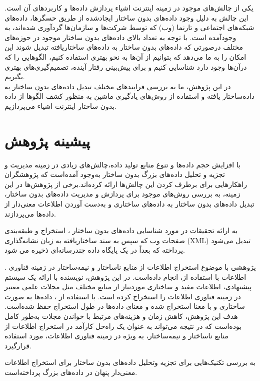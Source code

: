 یکی از چالش‌های موجود در زمینه اینترنت اشیاء پردازش داده‌ها و کاربرد‌های آن است. این چالش به دلیل وجود داده‌های بدون ساختار ایجاد‌شده از طریق حسگرها، داده‌های شبکه‌های اجتماعی و تارنما (وب) که توسط شرکت‌ها و سازمان‌ها گرد‌آوری شده‌اند، به وجود‌آمده است. با توجه به تعداد بالای داده‌های بدون ساختار موجود در حوزه‌های مختلف درصورتی که داده‌های بدون ساختار به داده‌های ساختاریافته تبدیل شوند این امکان را به ما می‌دهد که بتوانیم از آن‌ها به نحو بهتری استفاده کنیم، الگوهایی را که درآن‌ها وجود دارد شناسایی کنیم و برای پیش‌بینی رفتار آینده، تصمیم‌گیری‌های بهتری بگیریم.
\\
در این پژوهش، ما به بررسی فرایندهای مختلف تبدیل داده‌های بدون ساختار به داده‌ساختار یافته و استفاده از روش‌های یادگیری ماشین به منظور کشف الگوها از داده‌ بدون ساختار اینترنت اشیاء می‌پردازیم.
\section{پیشینه پژوهش}
با افزایش حجم داده‌ها و تنوع منابع تولید داده،چالش‌های زیادی در زمینه مدیریت و تجزیه و تحلیل داده‌های بزرگ بدون ساختار به‌وجود آمده‌است که پژوهشگران راهکارهایی برای برطرف کردن این چالش‌ها ارائه‌ کرده‌اند.برخی از پژوهش‌ها در این زمینه، به بررسی روش‌های موجود برای پردازش و مدیریت داده‌های بدون ساختار، تبدیل داده‌های بدون ساختار به داده‌های ساختاری و به‌دست آوردن اطلاعات معنی‌دار از داده‌ها می‌پردازند. 

\cite{abidin2010}
به ارائه تحقیقات در مورد شناسایی داده‌های بدون ساختار ، استخراج و طبقه‌بندی صفحات وب که سپس به سند ساختاریافته به زبان نشانه‌گذاری (XML) تبدیل می‌شود پرداخته که بعداً در یک پایگاه داده چندرسانه‌ای ذخیره می شود.

\citep{gandhi2016}.
پژوهشی با موضوع استخراج اطلاعات از منابع نا‌ساختار و نیمه‌ساختار در زمینه فناوری اطلاعات با استفاده از، انجام داده‌است. در این پژوهش، نویسنده با ارائه یک سیستم پیشنهادی، اطلاعات مفید و ساختاری موردنیاز از منابع مختلف مثل مجلات علمی معتبر در زمینه فناوری اطلاعات را استخراج کرده است. با استفاده از ، داده‌ها به صورت ساختاری و با معنا استخراج شده و معنای داده‌ها در طول استخراج حفظ شده‌است. هدف این پژوهش، کاهش زمان و هزینه‌های مرتبط با خواندن مجلات به‌طور کامل بوده‌است که در نتیجه می‌تواند به عنوان یک راه‌حل کارآمد در استخراج اطلاعات از منابع نا‌ساختار و نیمه‌ساختار، به ویژه در زمینه فناوری اطلاعات، مورد استفاده قرارگیرد.

\cite{mishra2017}
به بررسی تکنیک‌هایی برای تجزیه وتحلیل داده‌های بدون ساختار برای استخراج اطلاعات معنی‌دار پنهان در داده‌های بزرگ پرداخته‌است.

